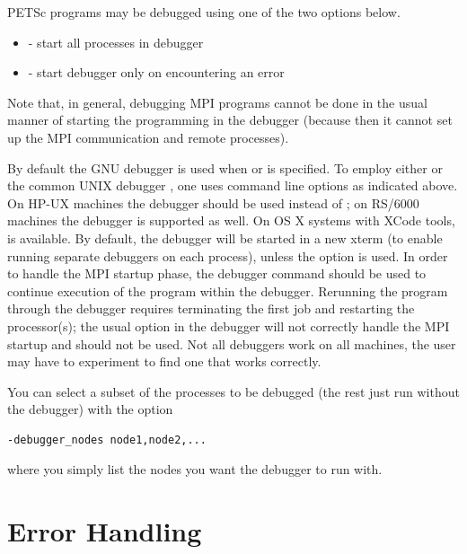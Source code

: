 {{{PETSc programs may be debugged using one of the two options below.
\begin{itemize}
\item {}  
     - start all processes in debugger
\item {} 
       - start debugger only on encountering an error
\end{itemize}
Note that, in general, debugging MPI programs cannot be done in the usual
manner of starting the programming in the debugger (because then it cannot
set up the MPI communication and remote processes).

By default the GNU debugger  is used when 
or  is specified. 
To employ either  or the common UNIX debugger , one uses
command line options as indicated above. On HP-UX machines the debugger
 should be used instead of ; on RS/6000 machines the
 debugger is supported as well.
On OS X systems with XCode tools,  is available.
By  default, the debugger will be started in a new xterm (to enable
running separate debuggers on each process), unless the option
 is used.
In order to handle the MPI startup phase, the debugger command 
should be used to continue execution of the program within the debugger.
Rerunning the program through the debugger requires terminating
the first job and restarting the processor(s); the usual 
option in the debugger will not correctly handle the MPI startup and
should not be used.  Not all debuggers work on all machines, the user
may have to experiment to find one that works correctly.

You can select a subset of the processes to be debugged (the rest just run
without the debugger) with the option
\begin{lstlisting}
-debugger_nodes node1,node2,...
\end{lstlisting}
where you simply list the nodes you want the debugger to run with.

\section{Error Handling}  

}}}
